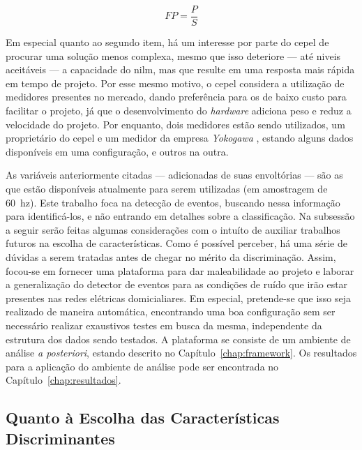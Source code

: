 \begin{equation} \label{eq:fp}
FP = \frac{P}{S}
\end{equation}

Em especial quanto ao segundo item, há um interesse por parte do
\gls{cepel} de procurar uma solução menos complexa, mesmo
que isso deteriore --- até niveis aceitáveis --- a capacidade do
\gls{nilm}, mas que resulte em uma resposta mais rápida em tempo de
projeto. Por esse mesmo motivo, o \gls{cepel} considera a utilização
de medidores presentes no mercado, dando preferência para os de baixo
custo para facilitar o projeto, já que o desenvolvimento do
\emph{hardware} adiciona peso e reduz a velocidade do projeto. Por
enquanto, dois medidores estão sendo utilizados, um proprietário do
\acs{cepel} e um medidor da empresa \emph{Yokogawa}
\cite{yokogawa_medidor}, estando alguns dados disponíveis em uma
configuração, e outros na outra.

As variáveis anteriormente citadas --- adicionadas de suas envoltórias
--- são as que estão disponíveis atualmente para serem utilizadas (em
amostragem de 60~\acs{hz}).
Este trabalho foca na detecção de eventos, buscando nessa informação
para identificá-los, e não entrando em detalhes sobre a classificação.
Na subsessão a seguir serão feitas algumas considerações com o intuíto
de auxiliar trabalhos futuros na escolha de características. Como é possível
perceber, há uma série de dúvidas a serem tratadas antes de chegar no
mérito da discriminação. Assim, focou-se em fornecer uma
plataforma para dar maleabilidade ao projeto e laborar a generalização
do detector de eventos para as condições de ruído que irão estar
presentes nas redes elétricas domicialiares. Em especial, pretende-se
que isso seja realizado de maneira automática, encontrando uma boa
configuração sem ser necessário realizar exaustivos testes em busca da
mesma, independente da estrutura dos dados sendo testados. A
plataforma se consiste de um ambiente de análise \emph{a posteriori},
estando descrito no Capítulo~\ref{chap:framework}. 
Os resultados para a aplicação do ambiente de análise pode ser
encontrada no Capítulo~\ref{chap:resultados}.

\subsection{Quanto à Escolha das Características Discriminantes}
\label{ssec:caracteristicas}

